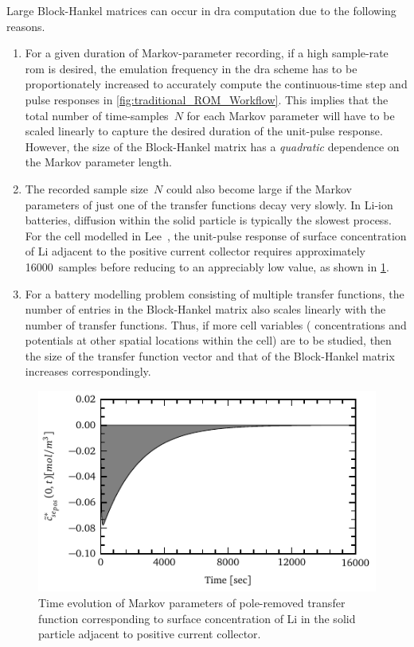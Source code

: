 Large Block-Hankel matrices can occur in \gls{dra} computation due to the
following reasons.
\begin{enumerate}
    \item
        For  a  given   duration  of  Markov-parameter  recording,   if  a  high
        sample-rate   \gls{rom}  is   desired,   the   emulation  frequency   in
        the   \gls{dra}  scheme   has   to  be   proportionately  increased   to
        accurately  compute  the continuous-time  step  and  pulse responses  in
        \cref{fig:traditional_ROM_Workflow}. This implies  that the total number
        of time-samples~$N$  for each  Markov parameter will  have to  be scaled
        linearly to  capture the  desired duration  of the  unit-pulse response.
        However,  the size  of the  Block-Hankel matrix  has a  \emph{quadratic}
        dependence on the Markov parameter length.
    \item
        The  recorded sample  size~$N$ could  also  become large  if the  Markov
        parameters of just  one of the transfer functions decay  very slowly. In
        Li-ion batteries, diffusion  within the solid particle  is typically the
        slowest process.  For the cell  modelled in Lee~\etal{},  the unit-pulse
        response of surface concentration of Li adjacent to the positive current
        collector  requires approximately  16000~samples before  reducing to  an
        appreciably low value, as shown in \cref{fig:markov_cse_pos}.
    \item
        For  a  battery  modelling   problem  consisting  of  multiple  transfer
        functions,  the  number  of  entries in  the  Block-Hankel  matrix  also
        scales linearly  with the  number of transfer  functions. Thus,  if more
        cell  variables (\eg{}  concentrations and  potentials at  other spatial
        locations  within the  cell) are  to be  studied, then  the size  of the
        transfer function vector  and that of the  Block-Hankel matrix increases
        correspondingly.
\end{enumerate}

\begin{figure}[!htbp]
    \centering
    \includegraphics{markov_decay.pdf}
    \caption[Markov parameters of solid surface concentration at positive
    current collector]{Time evolution of Markov parameters of pole-removed transfer
        function corresponding to surface concentration of Li in the solid particle
    adjacent to positive current collector.}
    \label{fig:markov_cse_pos}
\end{figure}

